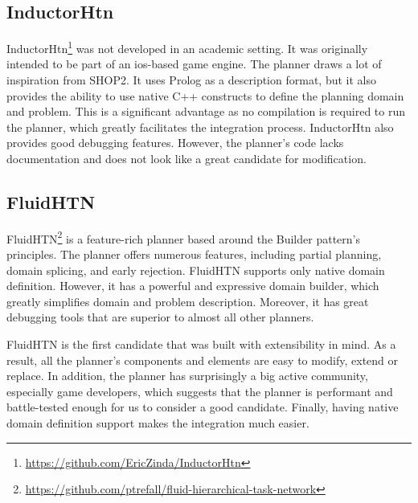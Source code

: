 \subsection*{InductorHtn}

InductorHtn\footnote{\url{https://github.com/EricZinda/InductorHtn}} was not developed in an academic setting. It was originally intended to be part of an ios-based game engine. The planner draws a lot of inspiration from SHOP2. It uses Prolog as a description format, but it also provides the ability to use native C++ constructs to define the planning domain and problem. This is a significant advantage as no compilation is required to run the planner, which greatly facilitates the integration process. InductorHtn also provides good debugging features. However, the planner's code lacks documentation and does not look like a great candidate for modification.


\subsection*{FluidHTN}

FluidHTN\footnote{\url{https://github.com/ptrefall/fluid-hierarchical-task-network}} is a feature-rich planner based around the Builder pattern's principles. The planner offers numerous features, including partial planning, domain splicing, and early rejection. FluidHTN supports only native domain definition. However, it has a powerful and expressive domain builder, which greatly simplifies domain and problem description. Moreover, it has great debugging tools that are superior to almost all other planners.

FluidHTN is the first candidate that was built with extensibility in mind. As a result, all the planner's components and elements are easy to modify, extend or replace. In addition, the planner has surprisingly a big active community, especially game developers, which suggests that the planner is performant and battle-tested enough for us to consider a good candidate. Finally, having native domain definition support makes the integration much easier. 


